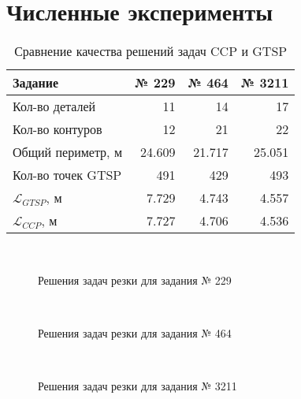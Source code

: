 
\section{Численные эксперименты}
\label{sec:ccp.exp}

\begin{table}[b]
  \centering
  \caption{Сравнение качества решений задач CCP и GTSP}
  \label{tab:ccp-vs-gtsp}
  \def\arraystretch{1.2}
  \begin{tabular}{l|*{3}{r}}
      Задание & № 229 & № 464 & № 3211 \\
      \hline
      Кол-во деталей & 11 & 14 & 17\\
      Кол-во контуров & 12 & 21 & 22 \\
      Общий периметр, м & 24.609 & 21.717 & 25.051 \\
      Кол-во точек GTSP & 491 & 429 & 493 \\
      $\mathcal L_{GTSP}$, м & 7.729 & 4.743 & 4.557 \\
      $\mathcal L_{CCP}$, м & 7.727 & 4.706 & 4.536 \\
      \hline
  \end{tabular}
\end{table}

\begin{figure}
  \centering
  \\
  \caption{Решения задач резки для задания № 229}
\end{figure}


\begin{figure}
  \centering
  \\
  \caption{Решения задач резки для задания № 464}
\end{figure}

\begin{figure}
  \centering
  \\
  \caption{Решения задач резки для задания № 3211}
\end{figure}
